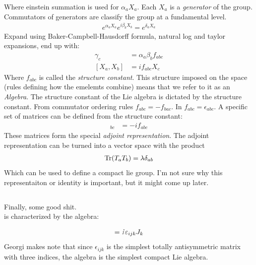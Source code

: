 Where einstein summation is used for \(\alpha_a X_a\). Each \(X_a\) is a \emph{generator} of the group. 
Commutators of generators are classify the group at a fundamental level. 
\begin{align*}
	e^{\alpha_aX_a}e^{i\beta_bX_b}=e^{\delta_aX_a}
\end{align*}
Expand using Baker-Campbell-Hausdorff formula, natural log and taylor expansions, end up with:
\begin{align*}
	\gamma_{c}&=\alpha_a\beta_bf_{abc}
	\\
	[X_a, X_b] &= if_{abc}X_c
\end{align*}
Where \(f_{abc}\) is called the \emph{structure constant}.
This structure imposed on the space (rules defining how the emelemts combine) means that we refer to it as an \emph{Algebra}. The structure constant of the Lie algebra is dictated by the structure constant. 
From commutator ordering rules \(f_{abc}=-f_{bac}\). 
In  \(f_{abc}=\epsilon_{abc}\). 
A specific set of matrices can be defined from the structure constant:
\begin{align*}
	[T_a]_{bc}&=-if_{abc}
\end{align*}
These matrices form the special \emph{adjoint representation}.
The adjoint representation can be turned into a vector space with the product
\begin{align*}
	\Tr(T_aT_b)=\lambda\delta_{ab}
\end{align*}
Which can be used to define a compact lie group. I'm not sure why this representaiton or identity is important, but it might come up later.
\subsection{\texorpdfstring{}{SU{2}}}
Finally, some good shit. 
\\
 is characterized by the algebra:

\begin{align*}
	[J_i,J_j]=\im\varepsilon_{ijk}J_k
\end{align*}
Georgi makes note that since \(\epsilon_{ijk}\) is the simplest totally antisymmetric matrix with three indices, the  algebra is the simplest compact Lie algebra.
\subsection{\texorpdfstring{}{SU{3}}}